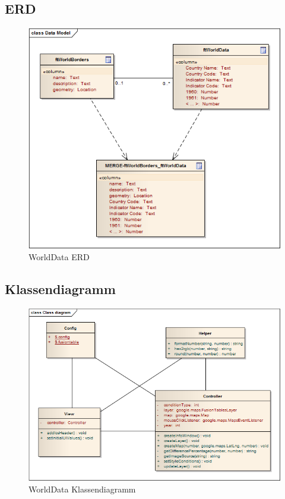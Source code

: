 \subsection{ERD}
\begin{figure}[!h]
	\centering
	\includegraphics[scale=0.8]{images/usecase1-worlddata/uml/worlddata-erd.png}
	\caption{WorldData ERD}
	\label{worlddata-erd}
\end{figure}

\subsection{Klassendiagramm}
\begin{figure}[!h]
	\centering
	\includegraphics[scale=0.7]{images/usecase1-worlddata/uml/worlddata-classdiagram.png}
	\caption{WorldData Klassendiagramm}
	\label{worlddata-classdiagram}
\end{figure}

